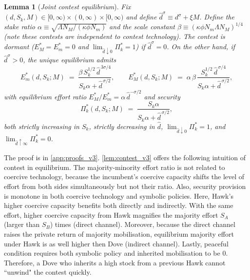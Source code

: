 \documentclass[11pt,twoside]{extarticle}
\newtheorem{lemma}{Lemma}
\begin{document}

\begin{lemma}[\emph{Joint contest equilibrium}]\label{lem:contest_v3}
Fix $(d,S_k,M)\in[0,\infty)\times(0,\infty)\times[0,\infty)$ and define $\hat d^\sigma\equiv d^\sigma+\xi M$. Define the stake ratio $\alpha\equiv\sqrt{\Lambda N_M/(\kappa\phi N_m)}$ and the scale constant $\beta\equiv(\kappa\phi N_m\Lambda N_M)^{1/4}$ (note these contests are independent to contest technology). 
The contest is dormant ($E_M^*=E_m^*=0$ and $\lim_{\hat d\downarrow 0}\Pi_k^*=1$) if $\hat d^\sigma=0$.
On the other hand, if $\hat d^\sigma>0$, the unique equilibrium admits
\begin{equation}\label{eq:Em_Sk_explicit_v3}
    E_m^*(d,S_k;M)\;=\;\frac{\beta\,S_k^{1/2}\,\hat d^{\,3\sigma/4}}{S_k\alpha+\hat d^{\,\sigma/2}},
    \qquad
    E_M^*(d,S_k;M)\;=\;\alpha\,\beta\,\frac{S_k^{1/2}\,\hat d^{\,\sigma/4}}{S_k\alpha+\hat d^{\,\sigma/2}},
\end{equation}
with equilibrium effort ratio $E_M^*/E_m^*=\alpha\,\hat d^{-\sigma/2}$ and security
\begin{equation}\label{eq:Pi_v3}
    \Pi_k^*(d,S_k;M)\;=\;\frac{S_k\alpha}{S_k\alpha+\hat d^{\,\sigma/2}},
\end{equation}
both strictly increasing in $S_k$, strictly decreasing in $\hat d$, $\lim_{\hat d\downarrow 0}\Pi_k^*=1$, and $\lim_{\hat d\uparrow\infty}\Pi_k^*=0$.
\end{lemma}

The proof is in \autoref{app:proofs_v3}.
\autoref{lem:contest_v3} offers the following intuition of contest in equilibrium. The majority-minority effort ratio is not related to coercive technology, because the incumbent's coercive capacity shifts the level of effort from both sides simultaneously but not their ratio. Also, security provision is monotone in both coercive technology and symbolic policies. Here, Hawk's higher coercive capacity benefits both directly and indirectly. With the same effort, higher coercive capacity from Hawk magnifies the majority effort $S_A$ (larger than $S_B$) times (direct channel). Moreover, because the direct channel raises the private return of majority mobilisation, equilibrium majority effort under Hawk is as well higher then Dove (indirect channel). Lastly, peaceful condition requires both symbolic policy and inherited mobilisation to be 0. Therefore, a Dove who inherits a high stock from a previous Hawk cannot ``unwind" the contest quickly. 
\end{document}

